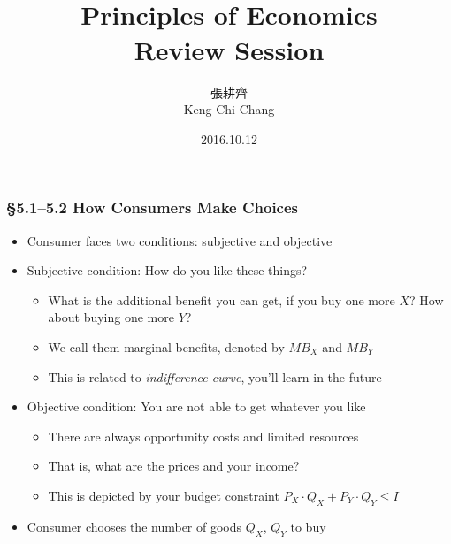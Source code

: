 \documentclass[12pt, xcolor=dvipsnames]{beamer}
\title{\bf{\Huge {}\\[-2mm] Principles of Economics \\[2mm] Review Session}}
\author{{\Large 張耕齊\\[2mm] Keng-Chi Chang}}
\institute{{}\\[-7mm]\footnotesize\tt{<r03323070@ntu.edu.tw>}\\[2mm]}
\date{\large 2016.10.12}
\begin{document}
\fontsize{12}{14pt}\selectfont

\begin{frame}
\titlepage
\end{frame}

\begin{frame}
\frametitle{\bf §5.1--5.2 How Consumers Make Choices}
\begin{itemize}
	\item Consumer faces two conditions: subjective and objective \pause
	\item Subjective condition: How do you like these things?
	\begin{itemize}
		\item What is the additional benefit you can get, if you buy one more $X$? How about buying one more $Y$?
		\item We call them marginal benefits, denoted by $MB_X$ and $MB_Y$
		\item This is related to {\it indifference curve}, you'll learn in the future \pause
	\end{itemize}
	\item Objective condition: You are not able to get whatever you like
	\begin{itemize}
		\item There are always opportunity costs and limited resources
		\item That is, what are the prices and your income?
		\item This is depicted by your budget constraint $P_X\cdot Q_X+P_Y\cdot Q_Y \leq I$
	\end{itemize}
	\item Consumer chooses the number of goods $Q_X$, $Q_Y$ to buy
\end{itemize}
\end{frame}
\end{document}
